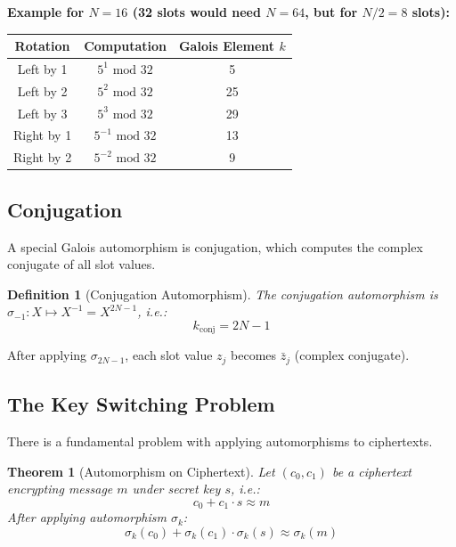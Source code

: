 \documentclass[11pt,a4paper]{article}
\newtheorem{definition}{Definition}
\newtheorem{theorem}{Theorem}
\newcommand{\bmod}{\text{ mod }}
\begin{document}
\textbf{Example for $N = 16$ (32 slots would need $N = 64$, but for $N/2 = 8$ slots):}
\begin{center}
\begin{tabular}{ccc}
\toprule
\textbf{Rotation} & \textbf{Computation} & \textbf{Galois Element $k$} \\
\midrule
Left by 1 & $5^1 \bmod 32$ & 5 \\
Left by 2 & $5^2 \bmod 32$ & 25 \\
Left by 3 & $5^3 \bmod 32$ & 29 \\
Right by 1 & $5^{-1} \bmod 32$ & 13 \\
Right by 2 & $5^{-2} \bmod 32$ & 9 \\
\bottomrule
\end{tabular}
\end{center}

\subsection{Conjugation}

A special Galois automorphism is conjugation, which computes the complex conjugate of all slot values.

\begin{definition}[Conjugation Automorphism]
The conjugation automorphism is $\sigma_{-1}: X \mapsto X^{-1} = X^{2N-1}$, i.e.:
\[
k_{\text{conj}} = 2N - 1
\]
\end{definition}

After applying $\sigma_{2N-1}$, each slot value $z_j$ becomes $\bar{z}_j$ (complex conjugate).

\subsection{The Key Switching Problem}

There is a fundamental problem with applying automorphisms to ciphertexts.

\begin{theorem}[Automorphism on Ciphertext]
Let $(c_0, c_1)$ be a ciphertext encrypting message $m$ under secret key $s$, i.e.:
\[
c_0 + c_1 \cdot s \approx m
\]
After applying automorphism $\sigma_k$:
\[
\sigma_k(c_0) + \sigma_k(c_1) \cdot \sigma_k(s) \approx \sigma_k(m)
\]
\end{theorem}
\end{document}

